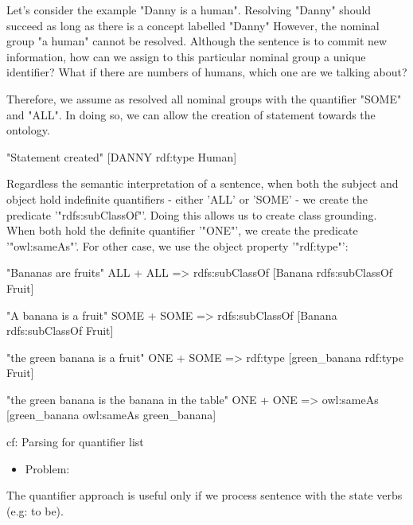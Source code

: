\documentclass[twoside,a4paper,10pt]{report}
\newcommand{\dokuitem}{\item}
\begin{document}
Let's consider the example "Danny is a human". Resolving "Danny" should succeed as long as there is a concept labelled "Danny"
However, the nominal group "a human" cannot be resolved. Although the sentence is to commit new information, how can we assign to this particular nominal group a unique identifier? What if there are numbers of humans, which one are we talking about? 

Therefore, we assume as resolved all nominal groups with the quantifier "SOME" and "ALL". In doing so, we can allow the creation of statement towards the ontology.



\small
\begin{verbatimtab}
  "Statement created"
  [DANNY rdf:type Human]
\end{verbatimtab}
\normalsize
Regardless the semantic interpretation of a sentence, when both the subject and object hold indefinite quantifiers - either 'ALL' or 'SOME' - we create the predicate '"rdfs:subClassOf"'.
Doing this allows us to create class grounding. When both hold the definite quantifier '"ONE"', we create the predicate '"owl:sameAs"'.  For other case, we use the object property '"rdf:type"':


\small
\begin{verbatimtab}
  
  "Bananas         are             fruits"
    ALL             +               ALL                   => rdfs:subClassOf
  [Banana     rdfs:subClassOf      Fruit]
  
  "A banana        is               a fruit"
    SOME           +                 SOME                 => rdfs:subClassOf
  [Banana     rdfs:subClassOf       Fruit]
  
  "the green banana    is           a fruit"
     ONE               +             SOME                 => rdf:type
  [green_banana    rdf:type         Fruit]
  
  "the green banana     is       the banana in the table"
      ONE               +                ONE              => owl:sameAs
  [green_banana    owl:sameAs       green_banana]
  
  cf: Parsing for quantifier list
  
\end{verbatimtab}
\normalsize

\begin{itemize}
\dokuitem  Problem:
\end{itemize}

The quantifier approach is useful only if we process sentence with the state verbs (e.g: to be).
\end{document}
